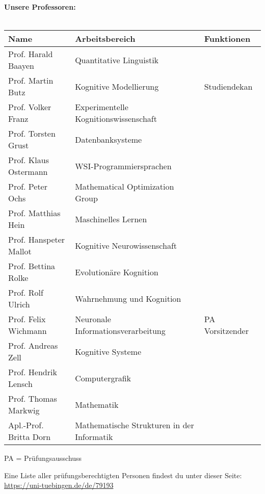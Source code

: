 \renewcommand{\arraystretch}{1}
\normalsize 
\textbf{Unsere Professoren:}\\\\
\footnotesize

\begin{tabular}{|p{}p{}p{}|}
\hline
Name                        & Arbeitsbereich                        & Funktionen \\
\hline
\hline
Prof. Harald Baayen			    & Quantitative Linguistik 				      & \\
Prof. Martin Butz           & Kognitive Modellierung 				        & Studiendekan	\\
Prof. Volker Franz			    & Experimentelle Kognitionswissenschaft	& \\
Prof. Torsten Grust		    & Datenbanksysteme                      & \\
Prof. Klaus Ostermann       & WSI-Programmiersprachen               & \\
Prof. Peter Ochs            & Mathematical Optimization Group       & \\
Prof. Matthias Hein			    & Maschinelles Lernen                   & \\
Prof. Hanspeter Mallot 		  & Kognitive Neurowissenschaft	          & \\
Prof. Bettina Rolke			    & Evolutionäre Kognition	              & \\
Prof. Rolf Ulrich			      & Wahrnehmung und Kognition	            & \\
Prof. Felix Wichmann        & Neuronale Informationsverarbeitung	  & PA Vorsitzender\\
Prof. Andreas Zell          & Kognitive Systeme 		                & \\
Prof. Hendrik Lensch        & Computergrafik                        & \\
Prof. Thomas Markwig        & Mathematik                            & \\
Apl.-Prof. Britta Dorn      & Mathematische Strukturen in der Informatik &\\
\hline
\end{tabular}

\scriptsize{PA = Prüfungsausschuss}

Eine Liste aller prüfungsberechtigten Personen findest du unter dieser Seite: \url{https://uni-tuebingen.de/de/79193}

